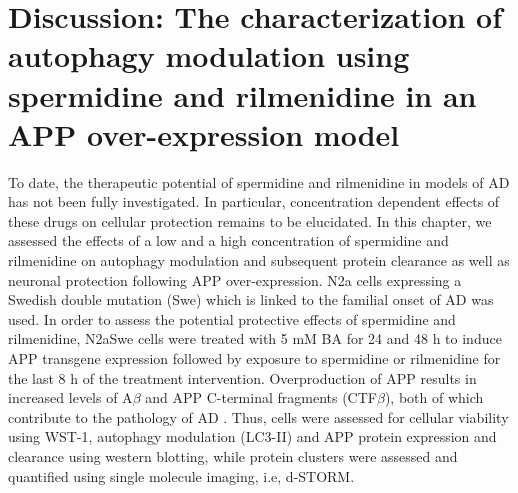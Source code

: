 \section{Discussion: The characterization of autophagy modulation using spermidine and rilmenidine in an APP over-expression model}
To date, the therapeutic potential of spermidine and rilmenidine in models of AD has not been fully investigated. In particular, concentration dependent effects of these drugs on cellular protection remains to be elucidated. In this chapter, we assessed the effects of a low and a high concentration of spermidine and rilmenidine on autophagy modulation and subsequent protein clearance as well as neuronal protection following APP over-expression. N2a cells expressing a Swedish double mutation (Swe) which is linked to the familial onset of AD was used. In order to assess the potential protective effects of spermidine and rilmenidine, N2aSwe cells were treated with 5 mM BA for 24 and 48 h to induce APP transgene expression \citep{Sisodia1990,Lo1994} followed by exposure to spermidine or rilmenidine for the last 8 h of the treatment intervention. Overproduction of APP results in increased levels of A$\beta$ and APP C-terminal fragments (CTF$\beta$), both of which contribute to the pathology of AD \citep{Walsh2007}. Thus, cells were assessed for cellular viability using WST-1, autophagy modulation (LC3-II) and APP protein expression and clearance using western blotting, while protein clusters were assessed and quantified using single molecule imaging, i.e, d-STORM.


